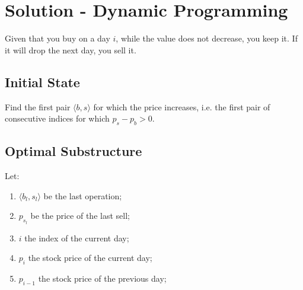 




\section{Solution - Dynamic Programming}

Given that you buy on a day $i$, while the value does not decrease, you keep it. If it will drop the next day, you sell it.

\subsection{Initial State}

Find the first pair $\langle b, s \rangle$ for which the price increases, i.e. the first pair of consecutive indices for which $p_s - p_b > 0$.

\subsection{Optimal Substructure}

Let:

\begin{enumerate}
    \item $\langle b_l, s_l \rangle$ be the last operation;
    \item $p_{s_l}$ be the price of the last sell;
    \item $i$ the index of the current day;
    \item $p_i$ the stock price of the current day;
    \item $p_{i-1}$ the stock price of the previous day;
\end{enumerate}

